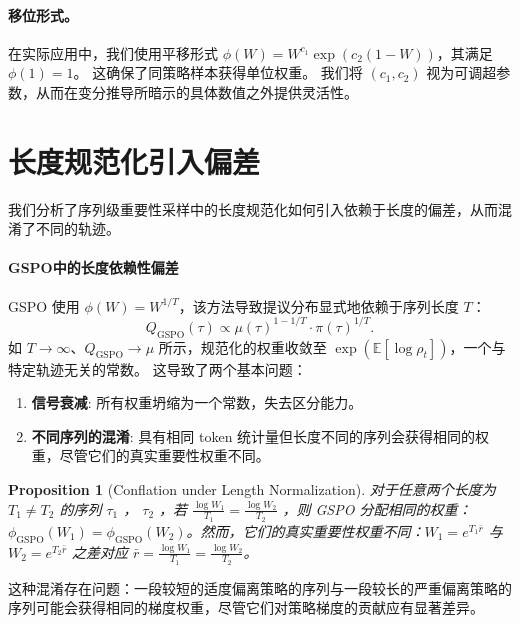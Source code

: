 \documentclass{article}
\theoremstyle{plain}
\newtheorem{proposition}[theorem]{Proposition}
\theoremstyle{definition}
\theoremstyle{remark}
\begin{document}
\paragraph{移位形式。}
在实际应用中，我们使用平移形式 $\phi(W) = W^{c_1} \exp(c_2(1 - W))$，其满足 $\phi(1) = 1$。  
这确保了同策略样本获得单位权重。  
我们将 $(c_1, c_2)$ 视为可调超参数，从而在变分推导所暗示的具体数值之外提供灵活性。


\section{长度规范化引入偏差}
\label{app:length-normalization}

我们分析了序列级重要性采样中的长度规范化如何引入依赖于长度的偏差，从而混淆了不同的轨迹。

\paragraph{GSPO中的长度依赖性偏差}
GSPO 使用 $\phi(W) = W^{1/T}$，该方法导致提议分布显式地依赖于序列长度 $T$：
\begin{equation}
  Q_{\text{GSPO}}(\tau) \propto \mu(\tau)^{1-1/T} \cdot \pi(\tau)^{1/T}.
\end{equation}
如 $T \to \infty$、$Q_{\text{GSPO}} \to \mu$ 所示，规范化的权重收敛至 $\exp(\mathbb{E}[\log \rho_t])$，一个与特定轨迹无关的常数。  
这导致了两个基本问题：
\begin{enumerate}[itemsep=2pt, topsep=2pt]
  \item \textbf{信号衰减}: 所有权重坍缩为一个常数，失去区分能力。
  \item \textbf{不同序列的混淆}: 具有相同 token 统计量但长度不同的序列会获得相同的权重，尽管它们的真实重要性权重不同。
\end{enumerate}

\begin{proposition}[Conflation under Length Normalization]
  \label{prop:gspo-conflation}
  对于任意两个长度为 $T_1 \neq T_2$ 的序列 $\tau_1$ ， $\tau_2$ ，若 $\frac{\log W_1}{T_1} = \frac{\log W_2}{T_2}$ ，则 GSPO 分配相同的权重：$\phi_{\text{GSPO}}(W_1) = \phi_{\text{GSPO}}(W_2)$。然而，它们的真实重要性权重不同：$W_1 = e^{T_1 \bar{r}}$ 与 $W_2 = e^{T_2 \bar{r}}$ 之差对应 $\bar{r} = \frac{\log W_1}{T_1} = \frac{\log W_2}{T_2}$。
\end{proposition}

这种混淆存在问题：一段较短的适度偏离策略的序列与一段较长的严重偏离策略的序列可能会获得相同的梯度权重，尽管它们对策略梯度的贡献应有显著差异。
\end{document}
